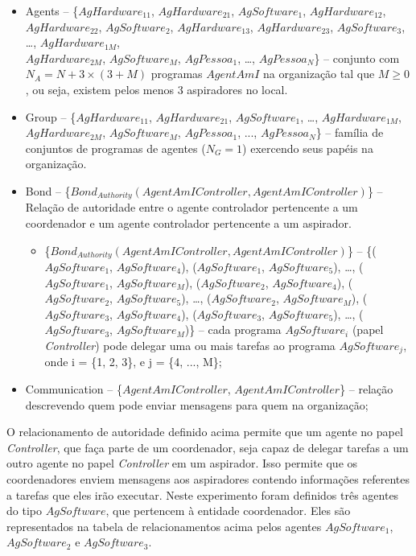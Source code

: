\begin{itemize}
    \item Agents -- \{$AgHardware_{11}$, $AgHardware_{21}$, $AgSoftware_1$, $AgHardware_{12}$, $AgHardware_{22}$, $AgSoftware_2$, $AgHardware_{13}$, $AgHardware_{23}$, $AgSoftware_3$, \ldots, $AgHardware_{1M}$, \\$AgHardware_{2M}$, $AgSoftware_M$, $AgPessoa_1$, \ldots, $AgPessoa_N$\} – conjunto com $N_A = N + 3 \times (3 + M)$ programas $AgentAmI$ na organização tal que $M \geq 0$, ou seja, existem pelos menos 3 aspiradores no local.

    \item Group --	\{$AgHardware_{11}$, $AgHardware_{21}$, $AgSoftware_1$, \ldots, $AgHardware_{1M}$, $AgHardware_{2M}$, $AgSoftware_M$, $AgPessoa_1$, ..., $AgPessoa_N$\} – família de conjuntos de programas de agentes ($N_G = 1$) exercendo seus papéis na organização.
    
    \item Bond -- \{$Bond_{Authority}(AgentAmIController, AgentAmIController)$\} – Relação de autoridade entre o agente controlador pertencente a um coordenador e um agente controlador pertencente a um aspirador.
    
    \begin{itemize}
        \item \{$Bond_{Authority}(AgentAmIController, AgentAmIController)$\} – \{($AgSoftware_1$, $AgSoftware_4$), ($AgSoftware_1$, $AgSoftware_5$), \ldots, ($AgSoftware_1$, $AgSoftware_M$), ($AgSoftware_2$, $AgSoftware_4$), ($AgSoftware_2$, $AgSoftware_5$), \ldots, ($AgSoftware_2$, $AgSoftware_M$), ($AgSoftware_3$, $AgSoftware_4$), ($AgSoftware_3$, $AgSoftware_5$), \ldots, ($AgSoftware_3$, $AgSoftware_M$)\} – cada  programa $AgSoftware_i$ (papel \textit{Controller}) pode delegar uma ou mais tarefas ao programa $AgSoftware_j$, onde i = \{1, 2, 3\}, e j = \{4, ..., M\};
    \end{itemize}

    \item Communication	-- \{$AgentAmIController$, $AgentAmIController$\} – relação descrevendo quem pode enviar mensagens para quem na organização;

\end{itemize}

O relacionamento de autoridade definido acima permite que um agente no papel \textit{Controller}, que faça parte de um coordenador, seja capaz de delegar tarefas a um outro agente no papel \textit{Controller} em um aspirador. Isso permite que os coordenadores enviem mensagens aos aspiradores contendo informações referentes a tarefas que eles irão executar. Neste experimento foram definidos três agentes do tipo $AgSoftware$, que pertencem à entidade coordenador. Eles são representados na tabela de relacionamentos acima pelos agentes $AgSoftware_1$, $AgSoftware_2$ e $AgSoftware_3$.

